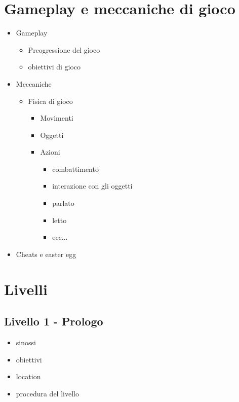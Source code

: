 \documentclass{report}
\begin{document}
\section{Gameplay e meccaniche di gioco}
\begin{itemize}
    \item Gameplay
    \begin{itemize}
        \item Preogressione del gioco
        \item obiettivi di gioco
    \end{itemize}
    \item Meccaniche
    \begin{itemize}
        \item Fisica di gioco
        \begin{itemize}
            \item Movimenti
            \item Oggetti
            \item Azioni
            \begin{itemize}
                \item combattimento
                \item interazione con gli oggetti
                \item parlato
                \item letto
                \item ecc...
            \end{itemize}
        \end{itemize}
    \end{itemize}
    \item Cheats e easter egg
\end{itemize}

\section{Livelli}
\subsection{Livello 1 - Prologo}
\begin{itemize}
    \item sinossi
    \item obiettivi
    \item location
    \item procedura del livello
\end{itemize}
\end{document}
